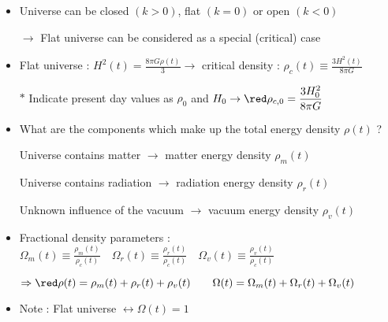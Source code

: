 \onecolumn
\begin{itemize}
\item Universe can be closed $(k>0)$, flat $(k=0)$ or open $(k<0)$
\item[] $\rightarrow$ {\blue Flat universe can be considered as a special (critical) case}
\item Flat universe : $\displaystyle H^{2}(t)=\frac{8\pi G\rho(t)}{3} \rightarrow$
      {\blue critical density : $\displaystyle \rho_{c}(t) \equiv \frac{3H^{2}(t)}{8\pi G}$}
\item[$\ast$] Indicate present day values as $\rho_{0}$ and $H_{0} \rightarrow
      \displaystyle {\red \rho_{c,0}=\frac{3H_{0}^{2}}{8\pi G}}$
\item {\blue What are the components which make up the total energy density $\rho(t)$ ?}
\item[] Universe contains {\red matter} $\rightarrow$ {\red matter energy density $\rho_{m}(t)$}
\item[] Universe contains {\red radiation} $\rightarrow$ {\red radiation energy density $\rho_{r}(t)$}
\item[] Unknown {\red influence of the vacuum} $\rightarrow$ {\red vacuum energy density $\rho_{v}(t)$}
\item {\blue Fractional density parameters : $\displaystyle
       \Omega_{m}(t) \equiv \frac{\rho_{m}(t)}{\rho_{c}(t)} \quad
       \Omega_{r}(t) \equiv \frac{\rho_{r}(t)}{\rho_{c}(t)} \quad
       \Omega_{v}(t) \equiv \frac{\rho_{v}(t)}{\rho_{c}(t)}$}
\item[] $\Rightarrow {\red \rho(t)=\rho_{m}(t)+\rho_{r}(t)+\rho_{v}(t) \qquad
         \Omega(t)=\Omega_{m}(t)+\Omega_{r}(t)+\Omega_{v}(t)}$
\item Note : {\blue Flat universe $\leftrightarrow \Omega(t)=1$}
\end{itemize}

